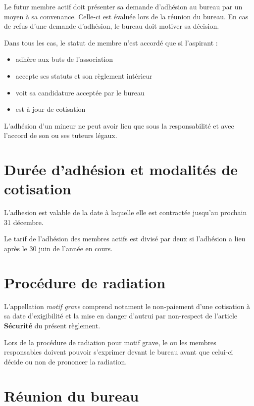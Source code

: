 \documentclass[a4paper, 11pt]{article}
\begin{document}
Le futur membre actif doit présenter sa demande d'adhésion au bureau par un moyen à sa convenance.
Celle-ci est évaluée lors de la réunion du bureau. En cas de refus d'une demande d'adhésion, le bureau doit motiver sa décision.

Dans tous les cas, le statut de membre n'est accordé que si l'aspirant :

\begin{itemize}
	\item adhère aux buts de l'association
	\item accepte ses statuts et son règlement intérieur
	\item voit sa candidature acceptée par le bureau
	\item est à jour de cotisation
\end{itemize}

L'adhésion d'un mineur ne peut avoir lieu que sous la responsabilité et avec l'accord de son ou ses tuteurs légaux.


\section{Durée d'adhésion et modalités de cotisation} %

L'adhesion est valable de la date à laquelle elle est contractée jusqu'au prochain 31 décembre.

Le tarif de l'adhésion des membres actifs est divisé par deux si l'adhésion a lieu après le 30 juin de l'année en cours.


\section{Procédure de radiation} %

L'appellation \emph{\og{}motif grave\fg{}}  comprend notament le non-paiement d'une cotisation à sa date d'exigibilité et la mise en danger d'autrui par non-respect de l'article \textbf{Sécurité} du présent règlement.

Lors de la procédure de radiation pour motif grave, le ou les membres responsables doivent pouvoir s'exprimer devant le
bureau avant que celui-ci décide ou non de prononcer la radiation.


\section{Réunion du bureau} %
\end{document}
